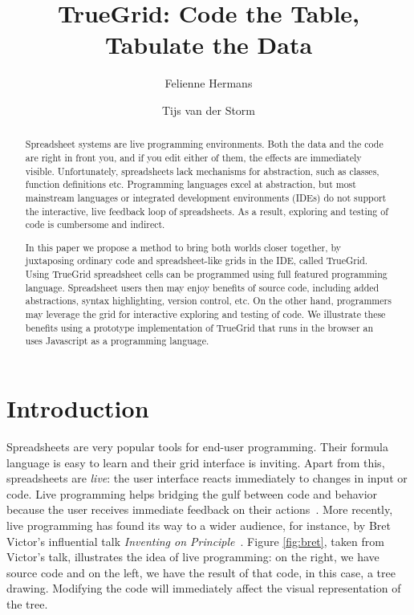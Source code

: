 \documentclass{llncs}
\begin{document}
\title{TrueGrid: Code the Table, Tabulate the Data}
\author{Felienne Hermans \and Tijs van der Storm}
\maketitle
\begin{abstract}
Spreadsheet systems are live programming environments. Both the data and the code are right in front you, and if you edit either of them, the effects are immediately visible. Unfortunately, spreadsheets lack mechanisms for abstraction, such as classes, function definitions etc. Programming languages excel at abstraction, but most mainstream languages or integrated development environments (IDEs) do not support the interactive, live feedback loop of spreadsheets. As a result, exploring and testing of code is cumbersome and indirect. 

In this paper we propose a method to bring both worlds closer together, by juxtaposing ordinary code and spreadsheet-like grids in the IDE, called TrueGrid. Using TrueGrid spreadsheet cells can be programmed using full featured programming language. Spreadsheet users then may enjoy benefits of source code, including added abstractions, syntax highlighting, version control, etc. On the other hand, programmers may leverage the grid for interactive exploring and testing of code. 
We illustrate these benefits using a prototype implementation of TrueGrid that runs in the browser an uses Javascript as a programming language.
\end{abstract}

\section{Introduction}
Spreadsheets are very popular tools for end-user programming. Their formula language is easy to learn and their grid interface is inviting. Apart from this, spreadsheets are \textit{live}: the  user interface reacts immediately to changes in input or code.
Live programming helps bridging the gulf between code and behavior because the user receives immediate feedback on their actions~\cite{lieberman1995bridging}.
More recently, live programming has found its way to a wider audience, for instance, by Bret Victor's influential talk \textit{Inventing on Principle}~\cite{Victor2012}. Figure \ref{fig:bret}, taken from Victor's talk, illustrates the idea of live programming: on the right, we have source code and on the left, we have the result of that code, in this case, a tree drawing. Modifying the code will immediately affect the visual representation of the tree.
\end{document}
